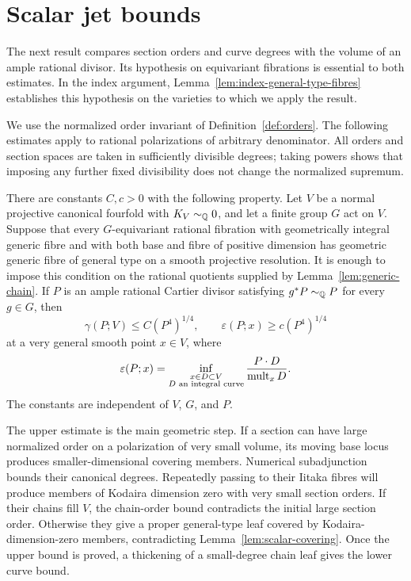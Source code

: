 \section{Scalar jet bounds}
\label{sec:scalar}

The next result compares section orders and curve degrees with the
volume of an ample rational divisor. Its hypothesis on equivariant
fibrations is essential to both estimates. In the index argument,
Lemma~\ref{lem:index-general-type-fibres} establishes this
hypothesis on the varieties to which we apply the result.

We use the normalized order invariant of Definition~\ref{def:orders}.
The following estimates apply to rational polarizations of arbitrary
denominator.  All orders and section spaces are taken in sufficiently
divisible degrees; taking powers shows that imposing any further fixed
divisibility does not change the normalized supremum.

\begin{theorem}\label{thm:scalar-bounds}
There are constants $C,c>0$ with the following property.  Let $V$ be a
normal projective canonical fourfold with $K_V\sim_{\mathbb Q}0$, and let a finite
group $G$ act on $V$.  Suppose that every $G$-equivariant rational fibration
with geometrically integral generic fibre and with both base and fibre of
positive dimension has geometric generic fibre of general type on a
smooth projective resolution.  It is enough to impose this condition on
the rational quotients supplied by Lemma~\ref{lem:generic-chain}.
If $P$ is an ample rational Cartier divisor satisfying
$g^*P\sim_{\mathbb Q}P$ for every $g\in G$, then
\begin{equation}\label{eq:scalar-bounds}
 \gamma(P;V)\le C(P^4)^{1/4},
 \qquad
 \varepsilon(P;x)\ge c(P^4)^{1/4}
\end{equation}
at a very general smooth point $x\in V$, where
\[
 \varepsilon(P;x)=
 \inf_{\substack{x\in D\subset V\\D\text{ an integral curve}}}
 \frac{P\cdot D}{\operatorname{mult}_xD}.
\]
The constants are independent of $V$, $G$, and $P$.
\end{theorem}

The upper estimate is the main geometric step. If a section can have
large normalized order on a polarization of very small volume, its
moving base locus produces smaller-dimensional covering members.
Numerical subadjunction bounds their canonical degrees. Repeatedly
passing to their Iitaka fibres will produce members of Kodaira dimension
zero with very small section orders. If their chains fill $V$, the
chain-order bound contradicts the initial large section order. Otherwise
they give a proper general-type leaf covered by Kodaira-dimension-zero
members, contradicting Lemma~\ref{lem:scalar-covering}. Once the upper
bound is proved, a thickening of a small-degree chain leaf gives the
lower curve bound.


